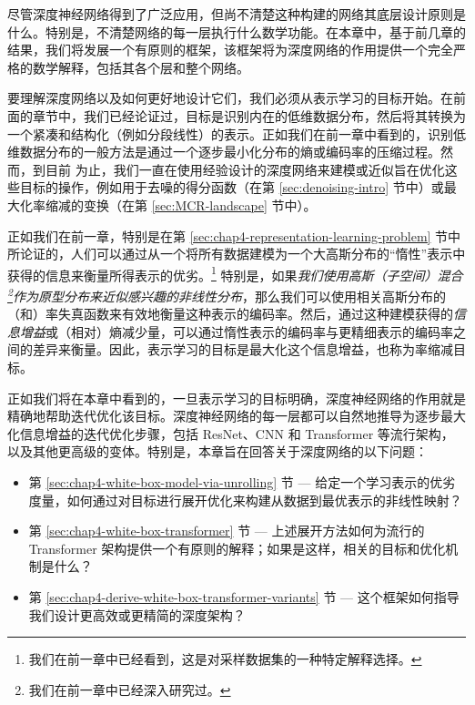 \documentclass[../../book-main.tex]{subfiles}
\begin{document}
尽管深度神经网络得到了广泛应用，但尚不清楚这种构建的网络其底层设计原则是什么。特别是，不清楚网络的每一层执行什么数学功能。在本章中，基于前几章的结果，我们将发展一个有原则的框架，该框架将为深度网络的作用提供一个完全严格的数学解释，包括其各个层和整个网络。

要理解深度网络以及如何更好地设计它们，我们必须从表示学习的目标开始。在前面的章节中，我们已经论证过，目标是识别内在的低维数据分布，然后将其转换为一个紧凑和结构化（例如分段线性）的表示。正如我们在前一章中看到的，识别低维数据分布的一般方法是通过一个逐步最小化分布的熵或编码率的压缩过程。然而，到目前
为止，我们一直在使用经验设计的深度网络来建模或近似旨在优化这些目标的操作，例如用于去噪的得分函数（在第 \ref{sec:denoising-intro} 节中）或最大化率缩减的变换（在第 \ref{sec:MCR-landscape} 节中）。

正如我们在前一章，特别是在第 \ref{sec:chap4-representation-learning-problem} 节中所论证的，人们可以通过从一个将所有数据建模为一个大高斯分布的“惰性”表示中获得的信息来衡量所得表示的优劣。\footnote{我们在前一章中已经看到，这是对采样数据集的一种特定解释选择。} 特别是，如果\textit{我们使用高斯（子空间）混合\footnote{我们在前一章中已经深入研究过。}作为原型分布来近似感兴趣的非线性分布}，那么我们可以使用相关高斯分布的（和）率失真函数来有效地衡量这种表示的编码率。然后，通过这种建模获得的{\em 信息增益}或（相对）熵减少量，可以通过惰性表示的编码率与更精细表示的编码率之间的差异来衡量。因此，表示学习的目标是最大化这个信息增益，也称为率缩减目标。

正如我们将在本章中看到的，一旦表示学习的目标明确，深度神经网络的作用就是精确地帮助迭代优化该目标。深度神经网络的每一层都可以自然地推导为逐步最大化信息增益的迭代优化步骤，包括 ResNet、CNN 和 Transformer 等流行架构，以及其他更高级的变体。特别是，本章旨在回答关于深度网络的以下问题：
\begin{itemize}
    \item 第 \ref{sec:chap4-white-box-model-via-unrolling} 节 --- 给定一个学习表示的优劣度量，如何通过对目标进行展开优化来构建从数据到最优表示的非线性映射？
    \item 第 \ref{sec:chap4-white-box-transformer} 节 --- 上述展开方法如何为流行的 Transformer 架构提供一个有原则的解释；如果是这样，相关的目标和优化机制是什么？
    \item 第 \ref{sec:chap4-derive-white-box-transformer-variants} 节 --- 这个框架如何指导我们设计更高效或更精简的深度架构？
\end{itemize}
\end{document}
